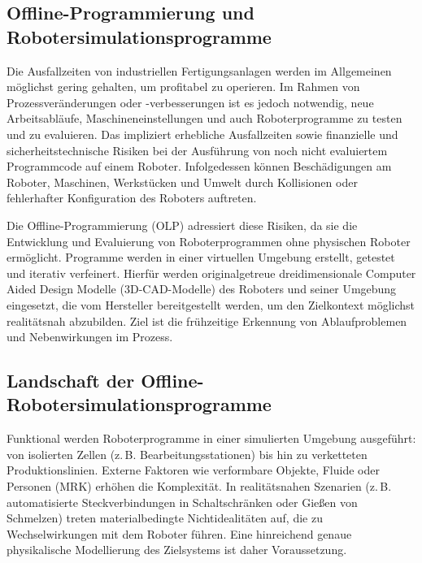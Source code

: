 \subsection{Offline-Programmierung und Robotersimulationsprogramme} Die
Ausfallzeiten von industriellen Fertigungsanlagen werden im Allgemeinen
möglichst gering gehalten, um profitabel zu operieren. Im Rahmen von
Prozessveränderungen oder -verbesserungen ist es jedoch notwendig, neue
Arbeitsabläufe, Maschineneinstellungen und auch Roboterprogramme zu testen und
zu evaluieren. Das impliziert erhebliche Ausfallzeiten sowie finanzielle und
sicherheitstechnische Risiken bei der Ausführung von noch nicht evaluiertem
Programmcode auf einem Roboter.
Infolgedessen können Beschädigungen am
Roboter, Maschinen, Werkstücken und Umwelt durch Kollisionen oder fehlerhafter
Konfiguration des Roboters auftreten.

Die Offline-Programmierung (OLP) adressiert diese Risiken, da sie die
Entwicklung und Evaluierung von Roboterprogrammen ohne physischen Roboter
ermöglicht. Programme werden in einer virtuellen Umgebung erstellt, getestet und
iterativ verfeinert. Hierfür werden originalgetreue dreidimensionale
Computer Aided Design Modelle (3D-CAD-Modelle) des Roboters
und seiner Umgebung eingesetzt, die vom Hersteller bereitgestellt werden, um den
Zielkontext möglichst realitätsnah abzubilden. Ziel ist die frühzeitige
Erkennung von Ablaufproblemen und Nebenwirkungen im Prozess.

\subsection{Landschaft der Offline-Robotersimulationsprogramme}
Funktional werden Roboterprogramme in einer simulierten Umgebung
ausgeführt: von isolierten Zellen
(z.\,B. Bearbeitungsstationen) bis hin zu verketteten Produktionslinien. Externe
Faktoren wie verformbare Objekte, Fluide oder Personen (MRK) erhöhen die
Komplexität. In realitätsnahen Szenarien (z.\,B. automatisierte
Steckverbindungen in Schaltschränken oder Gießen von Schmelzen) treten
materialbedingte Nichtidealitäten auf, die zu Wechselwirkungen mit dem Roboter
führen. Eine hinreichend genaue physikalische Modellierung des Zielsystems ist
daher Voraussetzung.

